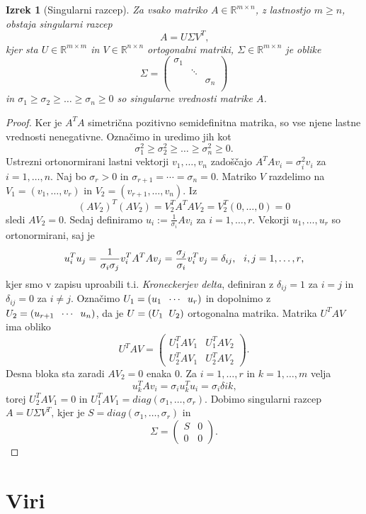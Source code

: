 \documentclass[mat1]{article}
\newtheorem{izrek}{Izrek}
\begin{document}
\begin{izrek}[Singularni razcep]
\label{izrek:SVD} Za vsako matriko $A \in \mathbb{R}^{m \times n}$, z lastnostjo $m \geq n$, obstaja singularni razcep 
$$A = U \Sigma V^T \text{,}$$
kjer sta $U \in \mathbb{R}^{m \times m}$ in $V \in \mathbb{R}^{n \times n}$ ortogonalni matriki, $\Sigma \in \mathbb{R}^{m \times n}$ je oblike
$$
\Sigma = 
\begin{pmatrix} 
\sigma_1 &  & \\
 & \ddots & \\
 & & \sigma_n  \\
 & & 
\end{pmatrix}$$
in $\sigma_1 \geq \sigma_2 \geq \ldots \geq \sigma_n \geq 0$ so singularne vrednosti matrike $A$.
\end{izrek}
\begin{proof}
Ker je $A^TA$ simetrična pozitivno semidefinitna matrika, so vse njene lastne vrednosti nenegativne. Označimo in uredimo jih kot
$$\sigma_1^2 \geq \sigma_2^2 \geq \ldots \geq \sigma_n^2 \geq 0 \text{.}$$
Ustrezni ortonormirani lastni vektorji $v_1, \ldots, v_n$ zadoščajo
$A^T A v_i = \sigma_i^2 v_i$ za $i = 1, \ldots, n \text{.}$
Naj bo $\sigma_r > 0$ in $\sigma_{r+1} = \cdots = \sigma_n = 0 \text{.}$
Matriko $V$ razdelimo na $V_1 = 
\left( v_1, \ldots, v_r
\right)$ in $V_2 = 
\left( v_{r+1}, \ldots, v_n
\right) \text{.}$ Iz
$$ (AV_2)^T (AV_2) = V_2^T A^T A V_2 = V_2^T \left( 0, \ldots, 0 \right) = 0
$$
sledi $AV_2 = 0 \text{.}$ Sedaj definiramo $u_i := \frac{1}{\sigma_i} Av_i$ za $i = 1, \ldots, r \text{.}$
Vekorji $u_1, \ldots, u_r$ so ortonormirani, saj je
$$ u_i^T u_j = \frac{1}{\sigma_i \sigma_j} v_i^T A^T A v_j = \frac{\sigma_j}{\sigma_i} v_i^T v_j = \delta_{ij} \text{,} \hspace{3mm} i,j = 1, \ldots, r \text{,}
$$
kjer smo v zapisu uproabili t.i. \emph{Kroneckerjev delta}, definiran z $\delta_{ij} = 1$ za $i = j$ in $\delta_{ij} = 0$ za $i \neq j$. Označimo 
$U_1 = 
\left( u_1 \hspace{2mm} \cdots \hspace{2mm} u_r
\right)$ in dopolnimo z $U_2 = 
\left( u_{r+1} \hspace{2mm} \cdots \hspace{2mm} u_n
\right)$, da je $ U = \left( U_1 \hspace{2mm} U_2 \right)$ ortogonalna matrika. Matrika $U^T A V$ ima obliko 
$$
U^T A V = 
\begin{pmatrix} 
U_1^T A V_1 & U_1^T A V_2 \\
U_2^T A V_1 & U_2^T A V_2
\end{pmatrix}
\text{.}
$$
Desna bloka sta zaradi $AV_2 = 0$ enaka $0$. Za $i = 1, \ldots, r$ in $k = 1, \ldots, m$ velja
$$ u_k^T A v_i = \sigma_i u_k^T u_i = \sigma_i \delta{ik} \text{,}
$$
torej $U_2^T A V_1 = 0$ in $U_1^T A V_1 = diag(\sigma_1, \ldots, \sigma_r) \text{.}$ Dobimo singularni razcep $A = U \Sigma V^T \text{,}$ kjer je $S = diag(\sigma_1, \ldots, \sigma_r)$ in 
$$ \Sigma = 
\begin{pmatrix} 
S & 0 \\
0 & 0
\end{pmatrix}
\text{.}$$

\end{proof}
\section{Viri}
\end{document}
